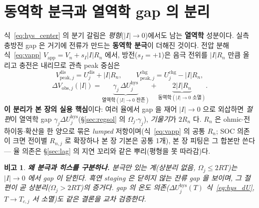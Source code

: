 \documentclass[11pt,a4paper]{article}
\newtheorem*{flagbox}{비고}
\newcommand{\app}{\mathrm{app}}
\newcommand{\dis}{\mathrm{dis}}
\newcommand{\chg}{\mathrm{chg}}
\newcommand{\hys}{\mathrm{hys}}
\begin{document}
\section{동역학 분극과 열역학 gap 의 분리}\label{sec:hys_pol}
식~\eqref{eq:hys_center} 의 분기 갈림은 \emph{평형}($|I|\to0$)에서도 남는 \textbf{열역학} 성분이다. 실측 충방전 gap 은
거기에 전류가 만드는 \textbf{동역학 분극}이 더해진 것이다. 전압 분해 식~\eqref{eq:vapp}
$V_\app=V_n+s_I|I|R_n$ 에서, 방전($s_I=+1$)은 음극 전위를 $|I|R_n$ 만큼 올리고 충전은 내리므로 관측 peak 중심은
\begin{equation}
V_{\mathrm{peak},j}^{\dis}=U_j^\dis+|I|R_n,\qquad V_{\mathrm{peak},j}^{\chg}=U_j^\chg-|I|R_n,
\label{eq:hys_obspeak}
\end{equation}
\begin{equation}
\boxed{\;\Delta V_{\mathrm{obs},j}(|I|)=\underbrace{\gamma_j\,\Delta U_j^\hys}_{\text{열역학}(|I|\to0\text{ 잔존})}
+\underbrace{2|I|R_n}_{\text{동역학}(|I|\to0\text{ 소멸})}.\;}
\label{eq:hys_obsgap}
\end{equation}
\textbf{이 분리가 본 장의 실용 핵심}이다: 여러 율에서 gap 을 재어 $|I|\to0$ 으로 외삽하면 \emph{절편}이 열역학
gap $\gamma_j\Delta U_j^\hys$(\S\ref{sec:regsol} 의 $\Omega_j$$\cdot$$\gamma_j$), \emph{기울기}가 $2R_n$ 다.
$R_n$ 은 ohmic$\cdot$전하이동$\cdot$확산을 한 양으로 묶은 \emph{lumped} 저항이며(식~\eqref{eq:vapp} 의 공통
$R_n$; SOC 의존이 크면 전이별 $R_{n,j}$ 로 확장하나 본 장 기본은 공통 1개), 본 장 피팅은 그
합본만 쓴다 — 율 의존은 \S\ref{sec:lag} 의 지연 꼬리와 같은 뿌리(평형을 못 따라감)다.
\begin{flagbox}
\textbf{왜 분극과 히스를 구분하나.} 분극만 있는 계(상분리 없음, $\Omega_j\le2RT$)는 $|I|\to0$ 에서 gap 이 \emph{닫힌다}.
흑연 staging 은 닫히지 않는 잔류 gap 을 보이며, 그 절편이 곧 상분리($\Omega_j>2RT$)의 증거다. gap 의 \emph{온도}
의존($\Delta U_j^\hys(T)$ 식~\eqref{eq:hys_dU}, $T\to T_{c,j}$ 서 소멸)도 같은 결론을 교차 검증한다.
\end{flagbox}

\end{document}
